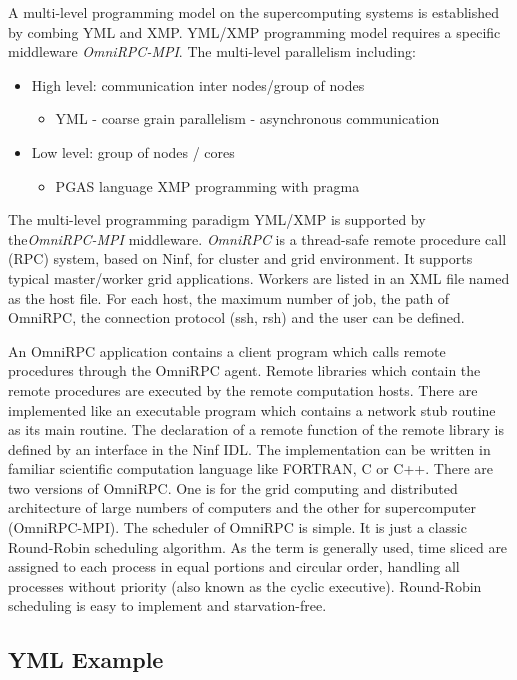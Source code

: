 A multi-level programming model  on the supercomputing systems is established by combing YML and XMP. YML/XMP programming model requires a specific middleware \textit{OmniRPC-MPI}. The multi-level parallelism including:

\begin{itemize}
	\item High level: communication inter nodes/group of nodes
	\begin{itemize}
		\item YML - coarse grain parallelism - asynchronous communication
	\end{itemize}
	\item Low level: group of nodes / cores
	\begin{itemize}
		\item PGAS language XMP programming with pragma
	\end{itemize}
\end{itemize}

The multi-level programming paradigm YML/XMP is supported by the\textit{OmniRPC-MPI} middleware. \textit{OmniRPC} is a thread-safe remote procedure call (RPC) system, based on Ninf, for cluster and grid environment. It supports typical master/worker grid applications. Workers are listed in an XML file named as the host file. For each host, the maximum number of job, the path of OmniRPC, the connection protocol (ssh, rsh) and the user can be defined.

An OmniRPC application contains a client program which calls remote procedures through the OmniRPC agent. Remote libraries which contain the remote procedures are executed by the remote computation hosts. There are implemented like an executable program which contains a network stub routine as its main routine. The declaration of a remote function of the remote library is defined by an interface in the Ninf IDL. The implementation can be written in familiar scientific computation language like FORTRAN, C or C++. There are two versions of OmniRPC. One is for the grid computing and distributed architecture of large numbers of computers and the other for supercomputer (OmniRPC-MPI).  The scheduler of OmniRPC is simple. It is just a classic Round-Robin scheduling algorithm.  As the term is generally used, time sliced are assigned to each process in equal portions and circular order, handling all processes without priority (also known as the cyclic executive). Round-Robin scheduling is easy to implement and starvation-free.

\subsection{YML Example}


